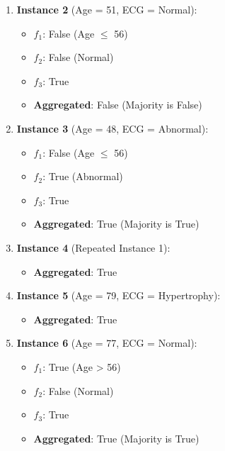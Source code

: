 \documentclass{article}
\begin{document}
\begin{enumerate}
\begin{enumerate}
    \item \textbf{Instance 2} (Age = 51, ECG = Normal):
    \begin{itemize}
        \item $f_1$: False (Age $\leq$ 56)
        \item $f_2$: False (Normal)
        \item $f_3$: True
        \item \textbf{Aggregated}: False (Majority is False)
    \end{itemize}

    \item \textbf{Instance 3} (Age = 48, ECG = Abnormal):
    \begin{itemize}
        \item $f_1$: False (Age $\leq$ 56)
        \item $f_2$: True (Abnormal)
        \item $f_3$: True
        \item \textbf{Aggregated}: True (Majority is True)
    \end{itemize}

    \item \textbf{Instance 4} (Repeated Instance 1):
    \begin{itemize}
        \item \textbf{Aggregated}: True
    \end{itemize}

    \item \textbf{Instance 5} (Age = 79, ECG = Hypertrophy):
    \begin{itemize}
        \item \textbf{Aggregated}: True
    \end{itemize}

    \item \textbf{Instance 6} (Age = 77, ECG = Normal):
    \begin{itemize}
        \item $f_1$: True (Age > 56)
        \item $f_2$: False (Normal)
        \item $f_3$: True
        \item \textbf{Aggregated}: True (Majority is True)
    \end{itemize}
\end{enumerate}
\break


\end{enumerate}
\end{document}
